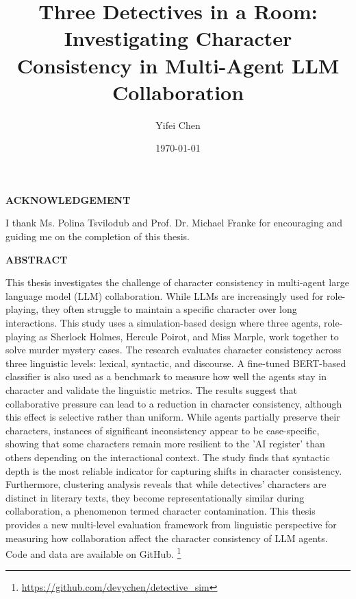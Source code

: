 \documentclass{article}
\title{Three Detectives in a Room: Investigating Character Consistency in Multi-Agent LLM Collaboration}
\author{Yifei Chen}
\date{\today}
\begin{document}
\maketitle

\newpage


\begin{center}
  \normalsize\bfseries\MakeUppercase{acknowledgement}
\end{center}
I thank Ms. Polina Tsvilodub and Prof. Dr. Michael Franke for encouraging and guiding me on the completion of this thesis.

\newpage


\begin{center}
  \normalsize\bfseries\MakeUppercase{abstract}
\end{center}
This thesis investigates the challenge of character consistency in multi-agent large language model (LLM) collaboration. While LLMs are increasingly used for role-playing, they often struggle to maintain a specific character over long interactions. This study uses a simulation-based design where three agents, role-playing as Sherlock Holmes, Hercule Poirot, and Miss Marple, work together to solve murder mystery cases. The research evaluates character consistency across three linguistic levels: lexical, syntactic, and discourse. A fine-tuned BERT-based classifier is also used as a benchmark to measure how well the agents stay in character and validate the linguistic metrics. The results suggest that collaborative pressure can lead to a reduction in character consistency, although this effect is selective rather than uniform. While agents partially preserve their characters, instances of significant inconsistency appear to be case-specific, showing that some characters remain more resilient to the 'AI register' than others depending on the interactional context. The study finds that syntactic depth is the most reliable indicator for capturing shifts in character consistency. Furthermore, clustering analysis reveals that while detectives' characters are distinct in literary texts, they become representationally similar during collaboration, a phenomenon termed character contamination. This thesis provides a new multi-level evaluation framework from linguistic perspective for measuring how collaboration affect the character consistency of LLM agents. Code and data are available on GitHub. \footnote{\url{https://github.com/devychen/detective_sim}}
\end{document}
